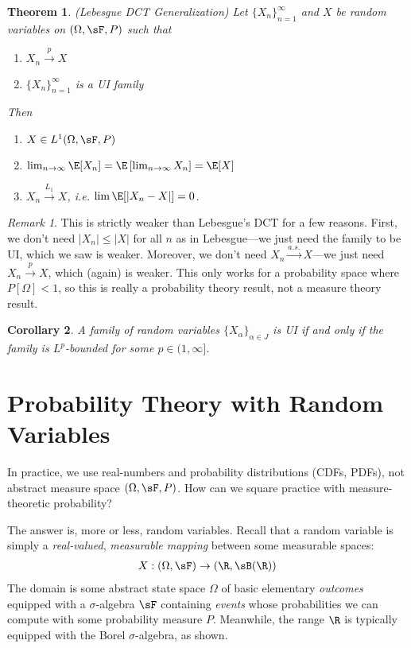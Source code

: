 \documentclass[12pt]{article}
\theoremstyle{plain}
\newtheorem{thm}{Theorem}[section]
\newtheorem{cor}[thm]{Corollary}
\theoremstyle{definition}
\theoremstyle{remark}
\newtheorem*{rmk}{Remark}
\newcommand{\ra}{\rightarrow}
\newcommand{\asto}{\xrightarrow{a.s.}}
\newcommand{\pto}{\xrightarrow{p}}
\newcommand{\Lqto}[1]{\xrightarrow{L_{#1}}}
\newcommand{\ninf}{_{n=1}^\infty}
\newcommand{\limn}{\lim_{n\rightarrow\infty}}
\begin{document}
\begin{thm}\emph{(Lebesgue DCT Generalization)}
Let $\{X_n\}\ninf$ and $X$ be random variables on $(\Omega,\sF,P)$ such
that
\begin{enumerate}[label=(\roman*)]
  \item $X_n\pto X$
  \item $\{X_n\}\ninf$ is a UI family
\end{enumerate}
Then
\begin{enumerate}[label=(\roman*)]
  \item $X\in L^1(\Omega,\sF,P)$
  \item $\limn \E[X_n] = \E\left[\limn X_n\right] = \E[X]$
  \item $X_n \Lqto{1} X$, i.e. $\lim \E[|X_n-X|] = 0$.
\end{enumerate}
\end{thm}
\begin{rmk}
This is strictly weaker than Lebesgue's DCT for a few reasons. First, we
don't need $|X_n|\leq |X|$ for all $n$ as in Lebesgue---we just need the
family to be UI, which we saw is weaker. Moreover, we don't need
$X_n\asto X$---we just need $X_n\pto X$, which (again) is weaker.
This only works for a probability space where $P[\Omega]<1$, so this is
really a probability theory result, not a measure theory result.
\end{rmk}


\begin{cor}
A family of random variables $\{X_\alpha\}_{\alpha\in J}$ is UI if and
only if the family is $L^p$-bounded for some $p\in(1,\infty]$.
\end{cor}


\clearpage
\section{Probability Theory with Random Variables}

In practice, we use real-numbers and probability distributions
(CDFs, PDFs), not abstract measure space $(\Omega,\sF,P)$. How can we
square practice with measure-theoretic probability?

The answer is, more or less, random variables.
Recall that a random variable is simply a \emph{real-valued},
\emph{measurable mapping} between some measurable spaces:
\begin{align*}
  X:(\Omega,\sF)\ra (\R,\sB(\R))
\end{align*}
The domain is some abstract state space $\Omega$ of basic elementary
\emph{outcomes} equipped with a $\sigma$-algebra $\sF$ containing
\emph{events} whose probabilities we can compute with some
probability measure $P$.
Meanwhile, the range $\R$ is typically equipped with the Borel
$\sigma$-algebra, as shown.
\end{document}
